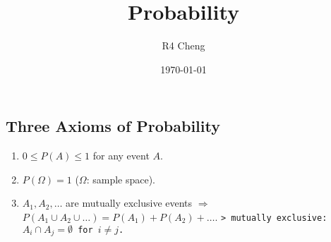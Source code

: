\documentclass[12pt,a4paper]{article}
\title{Probability}
\author{R4 Cheng}
\date{\today}
\begin{document}
\maketitle

\subsection*{Three Axioms of Probability}
\begin{enumerate}
\item $0 \leq P(A) \leq 1$ for any event $A$.
\item $P(\Omega) = 1$ ($\Omega$: sample space).
\item $A_1, A_2, \dots$ are mutually exclusive events $\Rightarrow$ $P(A_1 \cup A_2 \cup \dots) = P(A_1) + P(A_2) + \dots$.
\texttt{> mutually exclusive: $A_i \cap A_j = \emptyset$ for $i \neq j$.}
\end{enumerate}
\end{document}
